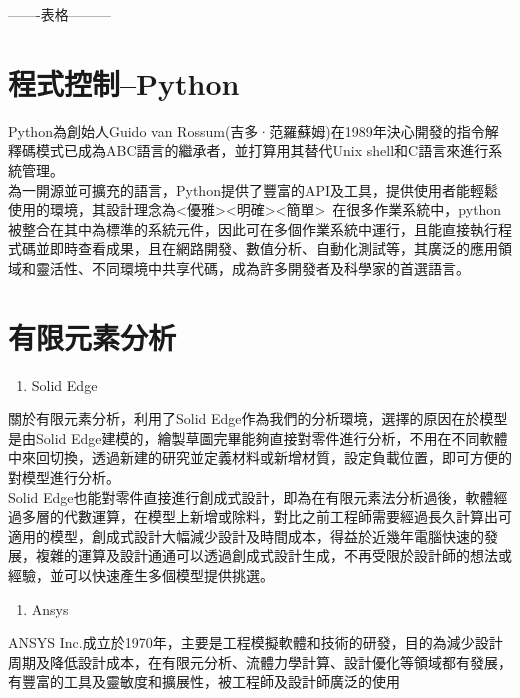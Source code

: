 -------表格---------
\newpage

\section{程式控制--Python}
Python為創始人Guido van Rossum(吉多·范羅蘇姆)在1989年決心開發的指令解釋碼模式已成為ABC語言的繼承者，並打算用其替代Unix shell和C語言來進行系統管理。\\

為一開源並可擴充的語言，Python提供了豐富的API及工具，提供使用者能輕鬆使用的環境，其設計理念為<優雅><明確><簡單>\
在很多作業系統中，python被整合在其中為標準的系統元件，因此可在多個作業系統中運行，且能直接執行程式碼並即時查看成果，且在網路開發、數值分析、自動化測試等，其廣泛的應用領域和靈活性、不同環境中共享代碼，成為許多開發者及科學家的首選語言。\\

\section{有限元素分析}
\begin{enumerate}
\item Solid Edge
\end{enumerate}
關於有限元素分析，利用了Solid Edge作為我們的分析環境，選擇的原因在於模型是由Solid Edge建模的，繪製草圖完畢能夠直接對零件進行分析，不用在不同軟體中來回切換，透過新建的研究並定義材料或新增材質，設定負載位置，即可方便的對模型進行分析。\\

Solid Edge也能對零件直接進行創成式設計，即為在有限元素法分析過後，軟體經過多層的代數運算，在模型上新增或除料，對比之前工程師需要經過長久計算出可適用的模型，創成式設計大幅減少設計及時間成本，得益於近幾年電腦快速的發展，複雜的運算及設計通通可以透過創成式設計生成，不再受限於設計師的想法或經驗，並可以快速產生多個模型提供挑選。\\

\begin{enumerate}
\item Ansys
\end{enumerate}
ANSYS Inc.成立於1970年，主要是工程模擬軟體和技術的研發，目的為減少設計周期及降低設計成本，在有限元分析、流體力學計算、設計優化等領域都有發展，有豐富的工具及靈敏度和擴展性，被工程師及設計師廣泛的使用\\

\newpage

